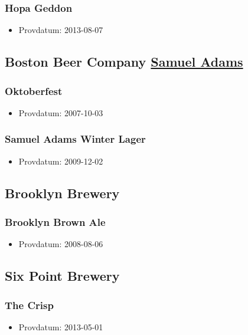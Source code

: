 \documentclass[11pt]{article}
\begin{document}
\subsubsection{Hopa Geddon}
\label{sec:org2719589}
\begin{itemize}
\item Provdatum: 2013-08-07
\end{itemize}
\subsection{Boston Beer Company \underline{Samuel Adams}}
\label{sec:org3f0cc56}
\subsubsection{Oktoberfest}
\label{sec:org25e3d4e}
\begin{itemize}
\item Provdatum: 2007-10-03
\end{itemize}
\subsubsection{Samuel Adams Winter Lager}
\label{sec:org8f5e11b}
\begin{itemize}
\item Provdatum: 2009-12-02
\end{itemize}
\subsection{Brooklyn Brewery}
\label{sec:org21af418}
\subsubsection{Brooklyn Brown Ale}
\label{sec:org805063e}
\begin{itemize}
\item Provdatum: 2008-08-06
\end{itemize}
\subsection{Six Point Brewery}
\label{sec:orgf6f5b99}
\subsubsection{The Crisp}
\label{sec:org191cfd4}
\begin{itemize}
\item Provdatum: 2013-05-01
\end{itemize}
\end{document}
